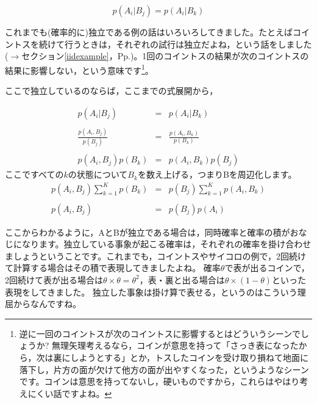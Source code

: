 \documentclass{ltjsbook}
\begin{document}
\[ p(A_i| B_j) = p(A_i|B_k) \]

これまでも(確率的に)独立である例の話はいろいろしてきました。たとえばコイントスを続けて行うときは，それぞれの試行は独立だよね，という話をしました($\to$セクション\ref{iidexample}，Pp.\pageref{iidexample})。1回のコイントスの結果が次のコイントスの結果に影響しない，という意味です\footnote{逆に一回のコイントスが次のコイントスに影響するとはどういうシーンでしょうか? 無理矢理考えるなら，コインが意思を持って「さっき表になったから，次は裏にしようとする」とか，トスしたコインを受け取り損ねて地面に落下し，片方の面が欠けて他方の面が出やすくなった，というようなシーンです。コインは意思を持ってないし，硬いものですから，これらはやはり考えにくい話ですよね。}。

ここで独立しているのならば，ここまでの式展開から，

\begin{equation}
	\begin{array}{lll}
		p(A_i| B_j)               & = & p(A_i|B_k)                \\
		                          &   &                           \\
		\frac{p(A_i,B_j)}{p(B_j)} & = & \frac{p(A_i,B_k)}{p(B_k)} \\
		                          &   &                           \\
		p(A_i,B_j)p(B_k)          & = & p(A_i,B_k)p(B_j)
	\end{array}
\end{equation}
ここですべての$k$の状態について$B_k$を数え上げる，つまりBを周辺化します。
\begin{equation}
	\begin{array}{lll}
		p(A_i,B_j)\sum_{k=1}^K p(B_k) & = & p(B_j)\sum_{k=1}^K p(A_i,B_k) \\
		                              &   &                               \\
		p(A_i,B_j)                    & = & p(B_j)p(A_i)
	\end{array}
\end{equation}

ここからわかるように，AとBが独立である場合は，同時確率と確率の積がおなじになります。独立している事象が起こる確率は，それぞれの確率を掛け合わせましょうということです。これまでも，コイントスやサイコロの例で，2回続けて計算する場合はその積で表現してきましたよね。
確率$\theta$で表が出るコインで，2回続けて表が出る場合は$\theta \times \theta=\theta^2$，表・裏と出る場合は$\theta \times (1-\theta)$といった表現をしてきました。
独立した事象は掛け算で表せる，というのはこういう理屈からなんですね。
\end{document}
